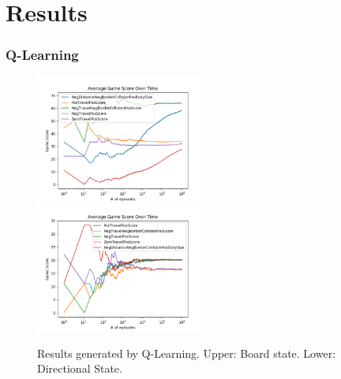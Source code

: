 \documentclass{beamer}
\begin{document}
    \section{Results}

    \begin{frame}
        \frametitle{Q-Learning}
        \begin{figure}
            \includegraphics[width=0.5\textwidth]{../images/qlearning/reward/42/reward_qlearning_board_state_average_game_score_over_time.png}
            \hfill
            \includegraphics[width=0.5\textwidth]{../images/qlearning/reward/42/reward_qlearning_directional_state_average_game_score_over_time.png}
            \caption{Results generated by Q-Learning. Upper: Board state. Lower: Directional State.}
            \label{fig:reward_result_qlearning}
        \end{figure}
    \end{frame}
\end{document}

